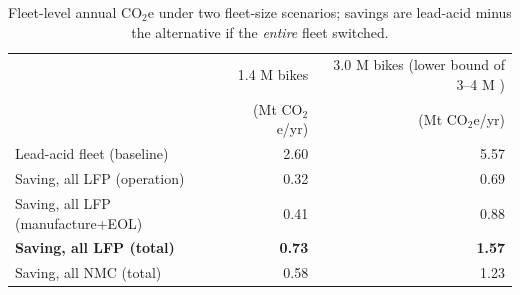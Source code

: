 \begin{table}[t]
\centering\small
\caption{Fleet-level annual CO$_2$e under two fleet-size scenarios; savings are lead-acid minus the alternative if the \emph{entire} fleet switched.}
\label{tab:co2fleet}
\begin{tabular}{lrr}
\toprule
 & 1.4 M bikes \citep{clean2024} & 3.0 M bikes (lower bound of 3--4 M \citep{pureearth_smep}) \\
 & (Mt CO$_2$e/yr) & (Mt CO$_2$e/yr) \\
\midrule
Lead-acid fleet (baseline) & 2.60 & 5.57 \\
Saving, all LFP (operation) & 0.32 & 0.69 \\
Saving, all LFP (manufacture+EOL) & 0.41 & 0.88 \\
\textbf{Saving, all LFP (total)} & \textbf{0.73} & \textbf{1.57} \\
Saving, all NMC (total) & 0.58 & 1.23 \\
\bottomrule
\end{tabular}
\end{table}
